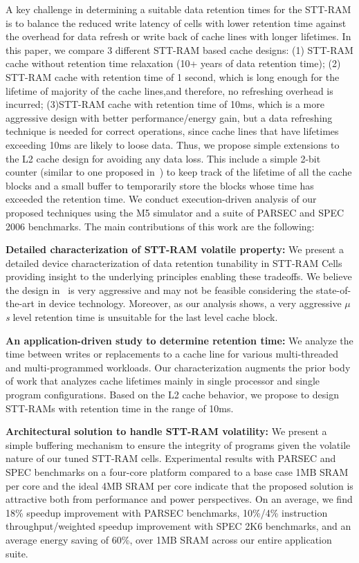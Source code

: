 A key challenge in determining a suitable data retention times for the STT-RAM is to balance the
reduced write latency of cells with lower retention time against the overhead for data refresh or
write back of cache lines with longer lifetimes. In this paper, we compare 3 different STT-RAM based
cache designs: (1) STT-RAM cache without retention time relaxation (10+ years of data retention
time); (2) STT-RAM cache with retention time of 1 second, which is long enough for the lifetime of
majority of the cache lines,and therefore, no refreshing overhead is incurred; (3)STT-RAM cache with
retention time of 10ms, which is a more aggressive design with better performance/energy gain, but a
data refreshing technique is needed for correct operations, since cache lines that have lifetimes
exceeding 10ms are likely to loose data. Thus, we propose simple extensions to the L2 cache design
for avoiding any data loss. This include a simple 2-bit counter (similar to one proposed
in~\cite{cache-decay-2001}) to keep track of the lifetime of all the cache blocks and a small buffer
to temporarily store the blocks whose time has exceeded the retention time. We conduct
execution-driven analysis of our proposed techniques using the M5 simulator and a suite of PARSEC and
SPEC 2006 benchmarks. The main contributions of this work are the following:

\noindent\textbf{Detailed characterization of STT-RAM volatile property:} We present a detailed
device characterization of data retention tunability in STT-RAM Cells providing insight to the
underlying principles enabling these tradeoffs. We believe the design in~\cite{STTRAM:HPCA11} is very
aggressive and may not be feasible considering the state-of-the-art in device technology. Moreover,
as our analysis shows, a very aggressive {\it $\mu$s} level retention time is unsuitable for the last
level cache block.

\noindent\textbf{An application-driven study to determine retention time:}
We analyze the time between writes or replacements to a cache line for
various multi-threaded and multi-programmed workloads. Our characterization
augments the prior body of work that analyzes cache lifetimes mainly in
single processor and single program configurations. Based on the L2 cache
behavior, we propose to design STT-RAMs with retention time in the range of 10ms.

\noindent\textbf{Architectural solution to handle STT-RAM volatility:} We present a simple buffering
mechanism to ensure the integrity of programs given the volatile nature of our tuned STT-RAM cells.
Experimental results with PARSEC and SPEC benchmarks on a four-core platform
compared to a base case 1MB SRAM per core and the ideal 4MB SRAM per core indicate that the proposed
solution is attractive both from performance and power perspectives. On an average, we find 18\% speedup
improvement with PARSEC benchmarks, 10\%/4\% instruction throughput/weighted speedup improvement
with SPEC 2K6 benchmarks, and an average energy saving of 60\%, over 1MB SRAM across our entire application suite.

